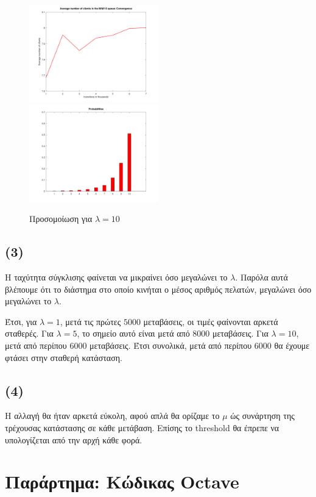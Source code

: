\documentclass {article}
\newcommand{\english}[1]{\foreignlanguage{english}{#1}}
\begin{document}
\begin{figure}
    \centering
    \includegraphics[width=0.5\textwidth]{lambda-10-average-clients.png}\hfill
    \includegraphics[width=0.5\textwidth]{lambda-10-probs.png}\hfill
    \caption{Προσομοίωση για $λ=10$}
    \label{fig:lambda-10}
\end{figure}

\subsection*{(3)}

Η ταχύτητα σύγκλισης φαίνεται να μικραίνει όσο μεγαλώνει το $λ$. Παρόλα αυτά βλέπουμε ότι το διάστημα στο οποίο κινήται ο μέσος αριθμός πελατών, μεγαλώνει όσο μεγαλώνει το $λ$. 

Έτσι, για $λ=1$, μετά τις πρώτες $5000$ μεταβάσεις, οι τιμές φαίνονται αρκετά σταθερές. Για $λ=5$, το σημείο αυτό είναι μετά από $8000$ μεταβάσεις. Για $λ=10$, μετά από περίπου $6000$ μεταβάσεις. Έτσι συνολικά, μετά από περίπου $6000$ θα έχουμε φτάσει στην σταθερή κατάσταση.

\subsection*{(4)}
Η αλλαγή θα ήταν αρκετά εύκολη, αφού απλά θα ορίζαμε το $μ$ ώς συνάρτηση της τρέχουσας κατάστασης σε κάθε μετάβαση. Επίσης το \english{threshold} θα έπρεπε να υπολογίζεται από την αρχή κάθε φορά.


\section*{Παράρτημα: Κώδικας \english{Octave}}





\end{document}
